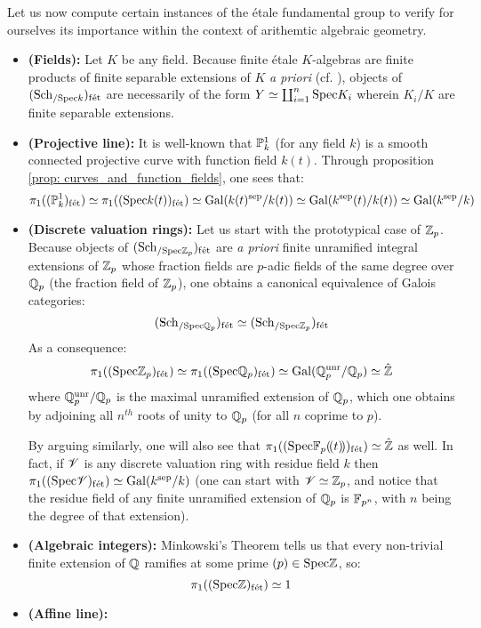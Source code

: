         Let us now compute certain instances of the \'etale fundamental group to verify for ourselves its importance within the context of arithemtic algebraic geometry.
        \begin{example} \label{example: etale_fundamental_groups}
            \noindent
            \begin{itemize}
                \item \textbf{(Fields):} Let $K$ be any field. Because finite \'etale $K$-algebras are finite products of finite separable extensions of $K$ \textit{a priori} (cf. \cite[\href{https://stacks.math.columbia.edu/tag/00U3}{Tag 00U3}]{stacks}), objects of $(\Sch_{/\Spec k})_{\fet}$ are necessarily of the form $Y \cong \coprod_{i = 1}^n \Spec K_i$ wherein $K_i/K$ are finite separable extensions. 
                \item \textbf{(Projective line):} It is well-known that $\P^1_k$ (for any field $k$) is a smooth connected projective curve with function field $k(t)$. Through proposition \ref{prop: curves_and_function_fields}, one sees that:
                    $$\pi_1((\P^1_k)_{\fet}) \cong \pi_1((\Spec k(t))_{\fet}) \cong \Gal(k(t)^{\sep}/k(t)) \cong \Gal(k^{\sep}(t)/k(t)) \cong \Gal(k^{\sep}/k)$$
                \item \textbf{(Discrete valuation rings):} Let us start with the prototypical case of $\Z_p$. Because objects of $(\Sch_{/\Spec \Z_p})_{\fet}$ are \textit{a priori} finite unramified integral extensions of $\Z_p$ whose fraction fields are $p$-adic fields of the same degree over $\Q_p$ (the fraction field of $\Z_p$), one obtains a canonical equivalence of Galois categories:
                    $$(\Sch_{/\Spec \Q_p})_{\fet} \cong (\Sch_{/\Spec \Z_p})_{\fet}$$
                As a consequence:
                    $$\pi_1((\Spec \Z_p)_{\fet}) \cong \pi_1((\Spec \Q_p)_{\fet}) \cong \Gal(\Q_p^{\unr}/\Q_p) \cong \hat{\Z}$$
                where $\Q_p^{\unr}/\Q_p$ is the maximal unramified extension of $\Q_p$, which one obtains by adjoining all $n^{th}$ roots of unity to $\Q_p$ (for all $n$ coprime to $p$).
                
                By arguing similarly, one will also see that $\pi_1((\Spec \F_p(\!(t)\!))_{\fet}) \cong \hat{\Z}$ as well. In fact, if $\scrV$ is any discrete valuation ring with residue field $k$ then $\pi_1((\Spec \scrV)_{\fet}) \cong \Gal(k^{\sep}/k)$ (one can start with $\scrV \cong \Z_p$, and notice that the residue field of any finite unramified extension of $\Q_p$ is $\F_{p^n}$, with $n$ being the degree of that extension).
                \item \textbf{(Algebraic integers):} Minkowski's Theorem tells us that every non-trivial finite extension of $\Q$ ramifies at some prime $(p) \in \Spec \Z$, so:
                    $$\pi_1((\Spec \Z)_{\fet}) \cong 1$$
                \item \textbf{(Affine line):} 
            \end{itemize}
        \end{example}
    

